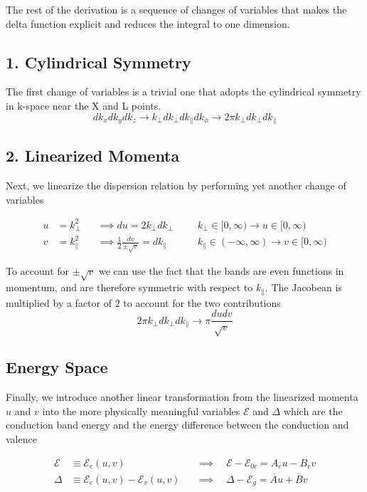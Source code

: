 The rest of the derivation is a sequence of changes of variables that makes the delta function explicit and reduces the integral to one dimension.

\subsection{1. Cylindrical Symmetry}
The first change of variables is a trivial one that adopts the cylindrical symmetry in k-space near the X and L points.
\begin{equation}
dk_{x}dk_{y} dk_{z}\to k_{\perp}dk_{\perp}dk_{\parallel}dk_{\phi}\to 2\pi k_{\perp} dk_{\perp} dk_{\parallel}
\label{eq:quadratic_interband_cov1}
\end{equation}

\subsection{2. Linearized Momenta}
Next, we linearize the dispersion relation by performing yet another change of variables

\begin{align}
u &= k_{\perp}^{2} &&\implies du = 2k_{\perp}dk_{\perp} &&& k_{\perp}\in[0,\infty)\to u\in[0,\infty)\\
v &= k_{\parallel}^{2} &&\implies \frac{1}{2}\frac{dv}{\pm\sqrt{ v }} = dk_{\parallel} &&& k_{\parallel}\in(-\infty,\infty)\to v\in[0,\infty)
\label{eq:quadratic_interband_cov2}
\end{align}

To account for $\pm\sqrt{ v }$ we can use the fact that the bands are even functions in momentum, and are therefore symmetric with respect to $k_{\parallel}$. The Jacobean is multiplied by a factor of $2$ to account for the two contributions
\begin{equation}
2\pi k_{\perp} dk_{\perp} dk_{\parallel} \to \pi \frac{dudv}{\sqrt{ v }}
\label{eq:quadratic_interband_jacobian}
\end{equation}

\subsection{Energy Space}
Finally, we introduce another linear transformation from the linearized momenta $u$ and $v$ into the more physically meaningful variables $\mathcal{E}$ and $\Delta$ which are the conduction band energy and the energy difference between the conduction and valence

\begin{align}
\mathcal{E} &\equiv \mathcal{E}_{c}(u,v)  &&\implies\quad \mathcal{E}-\mathcal{E}_{0c} = A_{c}u - B_{c}v\\
\Delta &\equiv \mathcal{E}_{c}(u,v) - \mathcal{E}_{v}(u,v) &&\implies\quad\Delta - \mathcal{E}_{g} = \overline{A}u + \overline{B}v
\label{eq:quadratic_interband_new_variables}
\end{align}

